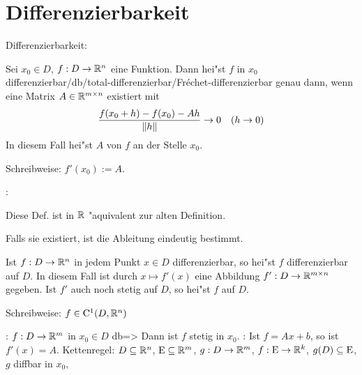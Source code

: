 \section{Differenzierbarkeit}
 Differenzierbarkeit:{
  Sei $x_0\in D$, $f:D\to\mathbb R^n$ eine Funktion. Dann hei"st $f$ in
  $x_0$ differenzierbar/db/total-differenzierbar/Fr{\'e}chet-differenzierbar 
  genau dann, wenn eine Matrix $A\in\mathbb R^{m\times n}$ existiert mit
  \[\frac{f(x_0+h)-f(x_0)-Ah}{{\left\| h\right\|}}\to 0\quad (h\to 0)
    \]
  In diesem Fall hei"st $A$  von $f$ an der Stelle $x_0$.
  
  Schreibweise: $f'(x_0):=A$.
  }
\remark:{
  \begin{stmts}
    \item Diese Def. ist in $\mathbb R$ "aquivalent zur alten Definition.
    \item Falls sie existiert, ist die Ableitung eindeutig bestimmt.
    \item Ist $f:D\to\mathbb R^n$ in jedem Punkt $x\in D$ differenzierbar,
      so hei"st $f$ differenzierbar auf $D$. In diesem Fall ist durch 
      $x\mapsto f'(x)$ eine Abbildung $f':D\to\mathbb R^{m\times n}$ gegeben. 
      Ist $f'$ auch noch stetig auf $D$, so hei"st $f$ 
       auf $D$.
      
      Schreibweise: $f\in{\rm C}^1(D,\mathbb R^n)$
    \end{stmts}
  }
\theorem:
  $f:D\to\mathbb R^m$ in $x_0\in D$ db=>{ 
  Dann ist $f$ stetig in $x_0$.
  }
\example:{
  Ist $f=Ax+b$, so ist $f'(x)=A$.
  }
\theorem Kettenregel:
  $D\subseteq \mathbb R^n$, ${\rm E}\subseteq \mathbb R^m$, $g:D\to\mathbb R^m$, 
  $f:{\rm E}\to\mathbb R^k$, $g(D)\subseteq{\rm E}$, $g$ diffbar in $x_0$,

